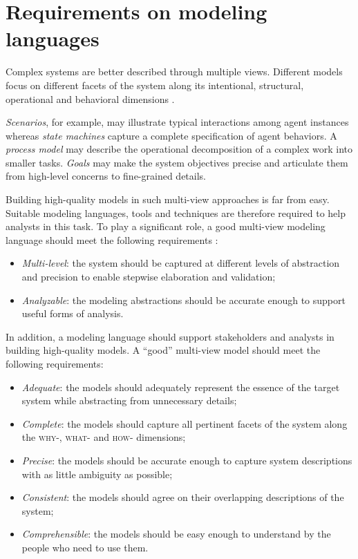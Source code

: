 \section[Requirements on modeling languages]{Requirements on modeling languages\label{section:intro-requirements}}

Complex systems are better described through multiple views. Different models focus on different facets of the system along its intentional, structural, operational and behavioral dimensions \cite{Rumbaugh:1991, Finkelstein:1992, VanLamsweerde:2009}. 

\emph{Scenarios}, for example, may illustrate typical interactions among agent instances whereas \emph{state machines} capture a complete specification of agent behaviors. A \emph{process model} may describe the operational decomposition of a complex work into smaller tasks. \emph{Goals} may make the system objectives precise and articulate them from high-level concerns to fine-grained details.

Building high-quality models in such multi-view approaches is far from easy. Suitable modeling languages, tools and techniques are therefore required to help analysts in this task. To play a significant role, a good multi-view modeling language should meet the following requirements \cite{VanLamsweerde:2009}:

\begin{itemize}
\item \emph{Multi-level}: the system should be captured at different levels of abstraction and precision to enable stepwise elaboration and validation;
\item \emph{Analyzable}: the modeling abstractions should be accurate enough to support useful forms of analysis.
\end{itemize}

In addition, a modeling language should support stakeholders and analysts in building high-quality models. A ``good'' multi-view model should meet the following requirements:

\begin{itemize}
\item \emph{Adequate}: the models should adequately represent the essence of the target system while abstracting from unnecessary details;
\item \emph{Complete}: the models should capture all pertinent facets of the system along the \textsc{why-}, \textsc{what-} and \textsc{how-} dimensions;
\item \emph{Precise}: the models should be accurate enough to capture system descriptions with as little ambiguity as possible;
\item \emph{Consistent}: the models should agree on their overlapping descriptions of the system;
\item \emph{Comprehensible}: the models should be easy enough to understand by the people who need to use them.
\end{itemize}

